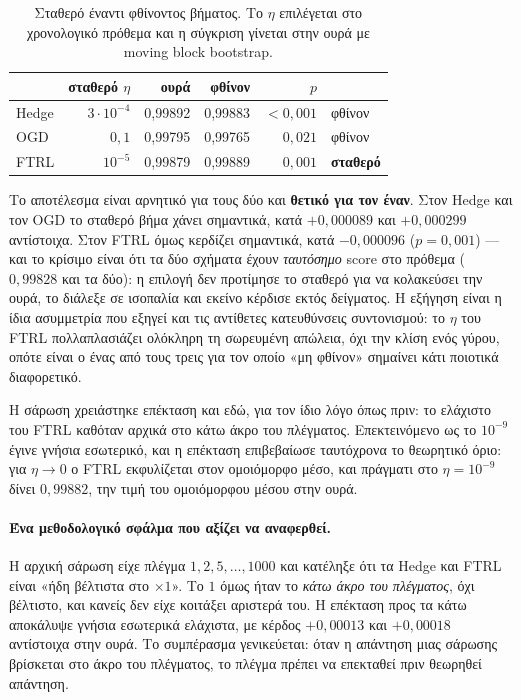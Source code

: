 \documentclass[12pt,a4paper,oneside]{report}
\renewcommand{\_}{\oldunderscore\allowbreak}
\theoremstyle{definition}
\theoremstyle{plain}
\theoremstyle{remark}
\begin{document}
\begin{table}[H]
\centering
\begin{tabular}{@{}lrrrrl@{}}
\toprule
& \textbf{σταθερό $\eta$} & \textbf{ουρά} & \textbf{φθίνον} & \textbf{$p$} & \\
\midrule
Hedge & $3\cdot10^{-4}$ & 0,99892 & 0,99883 & $<0{,}001$ & φθίνον \\
OGD   & $0{,}1$         & 0,99795 & 0,99765 & $0{,}021$  & φθίνον \\
FTRL  & $10^{-5}$       & 0,99879 & 0,99889 & $0{,}001$  & \textbf{σταθερό} \\
\bottomrule
\end{tabular}
\caption{Σταθερό έναντι φθίνοντος βήματος. Το $\eta$ επιλέγεται στο χρονολογικό πρόθεμα και η
σύγκριση γίνεται στην ουρά με moving block bootstrap.}
\label{tab:const-step}
\end{table}

Το αποτέλεσμα είναι αρνητικό για τους δύο και \textbf{θετικό για τον έναν}. Στον Hedge και τον
OGD το σταθερό βήμα χάνει σημαντικά, κατά $+0{,}000089$ και $+0{,}000299$ αντίστοιχα. Στον
FTRL όμως κερδίζει σημαντικά, κατά $-0{,}000096$ ($p=0{,}001$) --- και το κρίσιμο είναι ότι τα
δύο σχήματα έχουν \emph{ταυτόσημο} score στο πρόθεμα ($0{,}99828$ και τα δύο): η επιλογή δεν
προτίμησε το σταθερό για να κολακεύσει την ουρά, το διάλεξε σε ισοπαλία και εκείνο κέρδισε
εκτός δείγματος. Η εξήγηση είναι η ίδια ασυμμετρία που εξηγεί και τις αντίθετες κατευθύνσεις
συντονισμού: το $\eta$ του FTRL πολλαπλασιάζει ολόκληρη τη σωρευμένη απώλεια, όχι την κλίση
ενός γύρου, οπότε είναι ο ένας από τους τρεις για τον οποίο «μη φθίνον» σημαίνει κάτι ποιοτικά
διαφορετικό.

Η σάρωση χρειάστηκε επέκταση και εδώ, για τον ίδιο λόγο όπως πριν: το ελάχιστο του FTRL
καθόταν αρχικά στο κάτω άκρο του πλέγματος. Επεκτεινόμενο ως το $10^{-9}$ έγινε γνήσια
εσωτερικό, και η επέκταση επιβεβαίωσε ταυτόχρονα το θεωρητικό όριο: για
$\eta \to 0$ ο FTRL εκφυλίζεται στον ομοιόμορφο μέσο, και πράγματι στο $\eta=10^{-9}$ δίνει
$0{,}99882$, την τιμή του ομοιόμορφου μέσου στην ουρά.

\paragraph{Ένα μεθοδολογικό σφάλμα που αξίζει να αναφερθεί.} Η αρχική σάρωση είχε πλέγμα
$1, 2, 5, \dots, 1000$ και κατέληξε ότι τα Hedge και FTRL είναι «ήδη βέλτιστα στο
$\times 1$». Το $1$ όμως ήταν το \emph{κάτω άκρο του πλέγματος}, όχι βέλτιστο, και κανείς
δεν είχε κοιτάξει αριστερά του. Η επέκταση προς τα κάτω αποκάλυψε γνήσια εσωτερικά ελάχιστα,
με κέρδος $+0{,}00013$ και $+0{,}00018$ αντίστοιχα στην ουρά. Το συμπέρασμα γενικεύεται: όταν
η απάντηση μιας σάρωσης βρίσκεται στο άκρο του πλέγματος, το πλέγμα πρέπει να επεκταθεί πριν
θεωρηθεί απάντηση.
\end{document}
